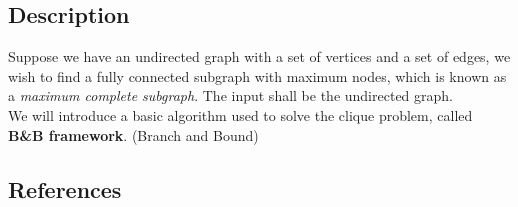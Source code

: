 \documentclass{article}
\begin{document}
\subsection*{Description}
 Suppose we have an undirected graph with a set of vertices and a set of edges, we wish to find a fully connected subgraph with maximum nodes, which is known as a \textit{maximum complete subgraph}. The input shall be the undirected graph. \\
 We will introduce a basic algorithm used to solve the clique problem, called \textbf{B\&B framework}. (Branch and Bound) 
\begin{Algorithm}[name\label{problem22}]
	\BlankLine
	\Ret

\end{Algorithm}

\subsection*{References}
\end{document}
